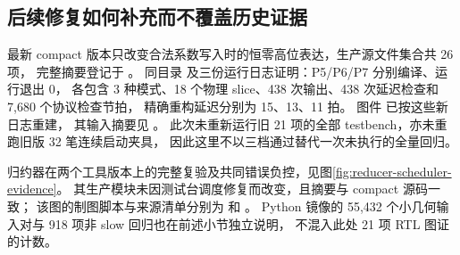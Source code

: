 \subsection{后续修复如何补充而不覆盖历史证据}
最新 compact 版本只改变合法系数写入时的恒零高位表达，生产源文件集合共 26 项，
完整摘要登记于 。
同目录  及三份运行日志证明：P5/P6/P7 分别编译、运行退出 0，
各包含 3 种模式、18 个物理 slice、438 次输出、438 次延迟检查和 7,680 个协议检查节拍，
精确重构延迟分别为 15、13、11 拍。
图件  已按这些新日志重建，
其输入摘要见 。
此次未重新运行旧 21 项的全部 testbench，亦未重跑旧版 32 笔连续启动夹具，
因此这里不以三档通过替代一次未执行的全量回归。

归约器在两个工具版本上的完整复验及共同错误负控，见图\ref{fig:reducer-scheduler-evidence}。
其生产模块未因测试台调度修复而改变，且摘要与 compact 源码一致；
该图的制图脚本与来源清单分别为  和
。
Python 镜像的 55,432 个小几何输入对与 918 项非 slow 回归也在前述小节独立说明，
不混入此处 21 项 RTL 图证的计数。
